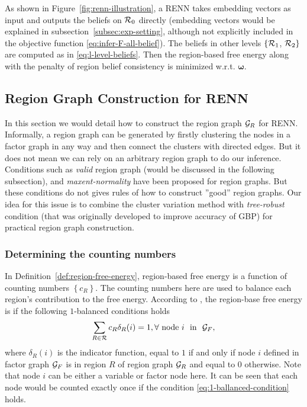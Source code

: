 As shown in Figure~\ref{fig:renn-illustration}, a RENN takes embedding vectors as input and outputs the beliefs on $\mathcal{R}_0$ directly (embedding vectors would be explained in subsection~\ref{subsec:exp-setting}, although not explicitly included in the objective function \eqref{eq:infer-F-all-belief}). The beliefs in other levels $\{\mathcal{R}_1$, $\mathcal{R}_2\}$ are computed as in \eqref{eq:l-level-beliefs}. Then the region-based free energy along with the penalty of region belief consistency is minimized w.r.t. $\bm{\omega}$.

\subsection{Region Graph Construction for RENN}
In this section we would detail how to construct the region graph $\mathcal{G}_R$ for RENN.
Informally, a region graph can be generated by firstly clustering the nodes in a factor graph in any way and then connect the clusters with directed edges. But it does not mean we can rely on an arbitrary region graph to do our inference. Conditions such as \textit{valid} region graph (would be discussed in the following subsection), and \textit{maxent-normality} \cite{yedida2005constucting,welling2005structured} have been proposed for region graphs. But these conditions do not gives rules of how to construct ''good'' region graphs.
Our idea for this issue is to combine the cluster variation method \cite{PhysRev.81.988,morita1991cluster} with \textit{tree-robust} condition \cite{gelfand2012generalized} (that was originally developed to improve accuracy of GBP) for practical region graph construction.


\subsubsection{Determining the counting numbers}
\label{subsec:count-number}
In Definition~\ref{def:region-free-energy}, region-based free energy is a function of counting numbers $\left\{ c_R \right\}$. The counting numbers here are used to balance each region's contribution to the free energy. According to \cite{yedida2005constucting}, the region-base free energy is  if the following $1$-balanced conditions holds
\begin{equation}\label{eq:1-ballanced-condition}
  \sum_{R\in\mathcal{R}} c_R \delta_{R}(i)  = 1, \forall~ \mathrm{node}~ i~~ \mathrm{in} ~~\mathcal{G}_F,
\end{equation}
where $\delta_{R}(i)$ is the indicator function, equal to $1$ if and only if node $i$ defined in factor graph $\mathcal{G}_F$ is in region $R$ of region graph $\mathcal{G}_R$ and equal to $0$ otherwise. Note that node $i$ can be either a variable or factor node here. It can be seen that each node would be counted exactly once if the condition \eqref{eq:1-ballanced-condition} holds.


